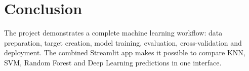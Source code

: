\documentclass[12pt,a4paper]{article}
\begin{document}
\section{Conclusion}

The project demonstrates a complete machine learning workflow: data preparation, target creation, model training, evaluation, cross-validation and deployment. The combined Streamlit app makes it possible to compare KNN, SVM, Random Forest and Deep Learning predictions in one interface.
\end{document}

